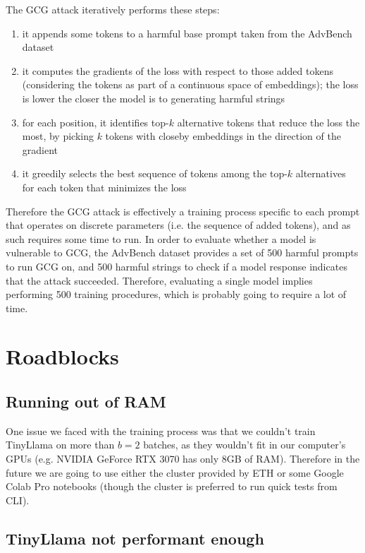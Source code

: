 \documentclass[11pt]{article}
\begin{document}
The GCG attack iteratively performs these steps:

\begin{enumerate}
    \item it appends some tokens to a harmful base prompt taken from the AdvBench dataset \cite{zou2023universal}
    \item it computes the gradients of the loss with respect to those added tokens (considering the tokens as part of a continuous space of embeddings); the loss is lower the closer the model is to generating harmful strings
    \item for each position, it identifies top-$k$ alternative tokens that reduce the loss the most, by picking $k$ tokens with closeby embeddings in the direction of the gradient
    \item it greedily selects the best sequence of tokens among the top-$k$ alternatives for each token that minimizes the loss
\end{enumerate}

Therefore the GCG attack is effectively a training process specific to each prompt that operates on discrete parameters (i.e. the sequence of added tokens), and as such requires some time to run. In order to evaluate whether a model is vulnerable to GCG, the AdvBench dataset provides a set of 500 harmful prompts to run GCG on, and 500 harmful strings to check if a model response indicates that the attack succeeded. Therefore, evaluating a single model implies performing 500 training procedures, which is probably going to require a lot of time.

\section{Roadblocks}
\label{sec:roadblocks}

\subsection{Running out of RAM}

One issue we faced with the training process was that we couldn't train TinyLlama on more than $b=2$ batches, as they wouldn't fit in our computer's GPUs (e.g. NVIDIA GeForce RTX 3070 has only 8GB of RAM). Therefore in the future we are going to use either the cluster provided by ETH or some Google Colab Pro notebooks (though the cluster is preferred to run quick tests from CLI).

\subsection{TinyLlama not performant enough}
\end{document}

